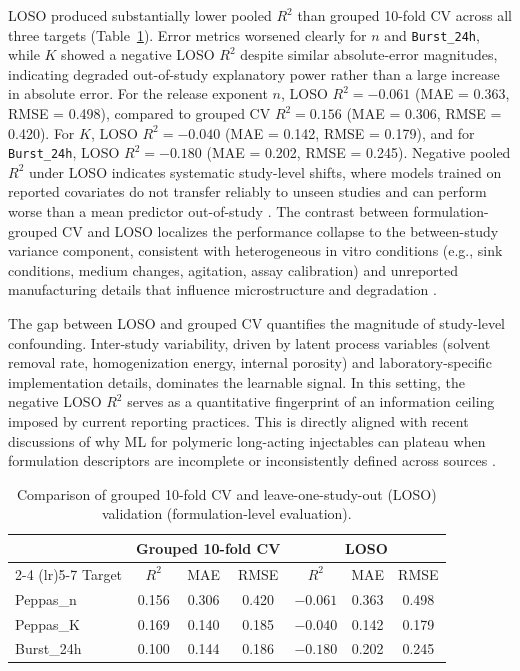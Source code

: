 \documentclass[preprint,12pt,authoryear]{elsarticle}
\begin{document}
\FloatBarrier



LOSO produced substantially lower pooled $R^2$ than grouped 10-fold CV across all three targets (Table~\ref{tab:loso}). Error metrics worsened clearly for $n$ and \texttt{Burst\_24h}, while $K$ showed a negative LOSO $R^2$ despite similar absolute-error magnitudes, indicating degraded out-of-study explanatory power rather than a large increase in absolute error. For the release exponent $n$, LOSO $R^2 = -0.061$ (MAE = 0.363, RMSE = 0.498), compared to grouped CV $R^2 = 0.156$ (MAE = 0.306, RMSE = 0.420). For $K$, LOSO $R^2 = -0.040$ (MAE = 0.142, RMSE = 0.179), and for \texttt{Burst\_24h}, LOSO $R^2 = -0.180$ (MAE = 0.202, RMSE = 0.245). Negative pooled $R^2$ under LOSO indicates systematic study-level shifts, where models trained on reported covariates do not transfer reliably to unseen studies and can perform worse than a mean predictor out-of-study \citep{Gramatica2007QSARValidation, Tropsha2010BestPracticesQSAR}. The contrast between formulation-grouped CV and LOSO localizes the performance collapse to the between-study variance component, consistent with heterogeneous in vitro conditions (e.g., sink conditions, medium changes, agitation, assay calibration) and unreported manufacturing details that influence microstructure and degradation \citep{Klose2011Sink, Fredenberg2011, Jain2000}.

The gap between LOSO and grouped CV quantifies the magnitude of study-level confounding. Inter-study variability, driven by latent process variables (solvent removal rate, homogenization energy, internal porosity) and laboratory-specific implementation details, dominates the learnable signal. In this setting, the negative LOSO $R^2$ serves as a quantitative fingerprint of an information ceiling imposed by current reporting practices. This is directly aligned with recent discussions of why ML for polymeric long-acting injectables can plateau when formulation descriptors are incomplete or inconsistently defined across sources \citep{Bannigan2023LAI, Bao2025IJP}.

\begin{table}[H]
\centering
\caption{Comparison of grouped 10-fold CV and leave-one-study-out (LOSO) validation (formulation-level evaluation).}
\label{tab:loso}
\begin{tabular}{lcccccc}
\toprule
 & \multicolumn{3}{c}{Grouped 10-fold CV} & \multicolumn{3}{c}{LOSO} \\
\cmidrule(lr){2-4} \cmidrule(lr){5-7}
Target & $R^2$ & MAE & RMSE & $R^2$ & MAE & RMSE \\
\midrule
Peppas\_n & 0.156 & 0.306 & 0.420 & $-0.061$ & 0.363 & 0.498 \\
Peppas\_K & 0.169 & 0.140 & 0.185 & $-0.040$ & 0.142 & 0.179 \\
Burst\_24h & 0.100 & 0.144 & 0.186 & $-0.180$ & 0.202 & 0.245 \\
\bottomrule
\end{tabular}
\end{table}
\end{document}

